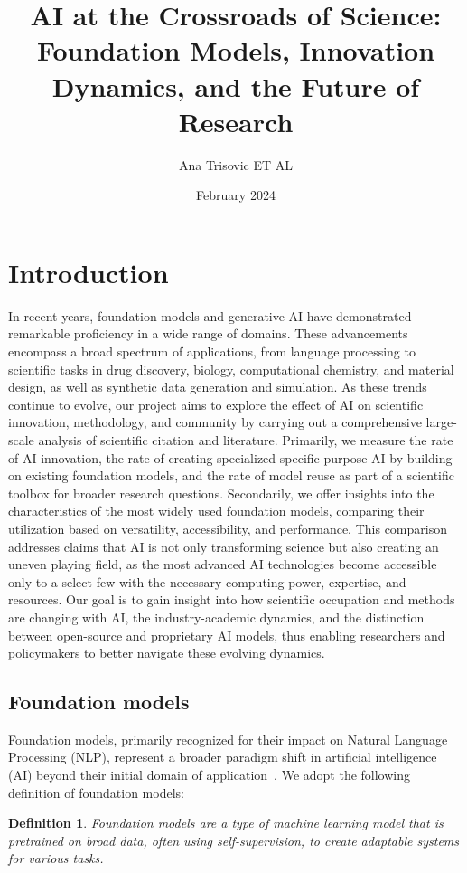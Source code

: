 \documentclass[acmsmall,authorversion]{acmart}
\title{AI at the Crossroads of Science: Foundation Models, Innovation Dynamics, and the Future of Research}
\author{Ana Trisovic ET AL}
\date{February 2024}
\newtheorem{definition}{Definition}
\begin{document}
\maketitle

\section{Introduction}

In recent years, foundation models and generative AI have demonstrated remarkable proficiency in a wide range of domains. These advancements encompass a broad spectrum of applications, from language processing to scientific tasks in drug discovery, biology, computational chemistry, and material design, as well as synthetic data generation and simulation. As these trends continue to evolve, our project aims to explore the effect of AI on scientific innovation, methodology, and community by carrying out a comprehensive large-scale analysis of scientific citation and literature. Primarily, we measure the rate of AI innovation, the rate of creating specialized specific-purpose AI by building on existing foundation models, and the rate of model reuse as part of a scientific toolbox for broader research questions. Secondarily, we offer insights into the characteristics of the most widely used foundation models, comparing their utilization based on versatility, accessibility, and performance. This comparison addresses claims that AI is not only transforming science but also creating an uneven playing field, as the most advanced AI technologies become accessible only to a select few with the necessary computing power, expertise, and resources. Our goal is to gain insight into how scientific occupation and methods are changing with AI, the industry-academic dynamics, and the distinction between open-source and proprietary AI models, thus enabling researchers and policymakers to better navigate these evolving dynamics.

\subsection{Foundation models}

Foundation models, primarily recognized for their impact on Natural Language Processing (NLP), represent a broader paradigm shift in artificial intelligence (AI) beyond their initial domain of application~\cite{bommasani2021opportunities}. We adopt the following definition of foundation models:

\begin{definition}
Foundation models are a type of machine learning model that is pretrained on broad data, often using self-supervision, to create adaptable systems for various tasks.
\end{definition}
\end{document}
